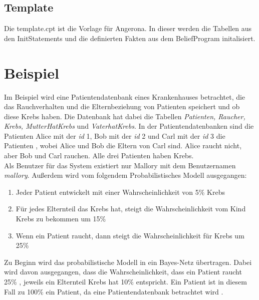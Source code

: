 \documentclass[german,version-2020-11]{uzl-thesis}
\begin{document}
\subsection{Template}
Die template.cpt ist die Vorlage für Angerona. In dieser werden die Tabellen aus den InitStatements und die definierten Fakten aus dem BeliefProgram initalisiert.
\section{Beispiel}
Im Beispiel wird  eine Patientendatenbank eines Krankenhauses betrachtet, die das Rauchverhalten und die Elternbeziehung von Patienten speichert und ob diese Krebs haben. Die Datenbank hat dabei die Tabellen \textit{Patienten, Raucher, Krebs, MutterHatKrebs } und \textit{VaterhatKrebs}. In der Patientendatenbanken sind die Patienten Alice mit der \textit{id} 1, Bob mit der \textit{id} 2 und Carl mit der \textit{id} 3 die Patienten , wobei Alice und Bob die Eltern von Carl sind. Alice raucht nicht, aber Bob und Carl rauchen. Alle drei Patienten haben Krebs.\\  Als Benutzer für das System existiert nur Mallory mit dem Benutzernamen \textit{mallory}. Außerdem wird vom folgendem Probabilistisches Modell ausgegangen: 
\begin{enumerate}
\item Jeder Patient entwickelt mit einer Wahrscheinlichkeit von 5\% Krebs
\item Für jedes Elternteil das Krebs hat, steigt die Wahrscheinlichkeit vom Kind Krebs zu bekommen um 15\%
\item Wenn ein Patient raucht, dann steigt die Wahrscheinlichkeit für Krebs um 25\%
\end{enumerate}
Zu Beginn  wird das probabilistische Modell in ein Bayes-Netz übertragen. Dabei wird davon ausgegangen, dass die Wahrscheinlichkeit, dass ein Patient raucht 25\% \cite{11}, jeweils ein Elternteil Krebs hat 10\% entspricht. Ein Patient ist in diesem Fall zu 100\% ein Patient, da eine Patientendatenbank betrachtet wird \cite{6}.  \\
\end{document}
